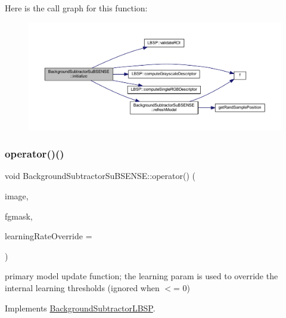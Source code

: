 Here is the call graph for this function\+:\nopagebreak
\begin{figure}[H]
\begin{center}
\leavevmode
\includegraphics[width=350pt]{class_background_subtractor_su_b_s_e_n_s_e_ac84aa66030b04a72435ef473cf0e6a3f_cgraph}
\end{center}
\end{figure}
\mbox{\label{class_background_subtractor_su_b_s_e_n_s_e_aaa60e2883c2b2cf130820b10104a653b}} 
\subsubsection{\texorpdfstring{operator()()}{operator()()}}
{\footnotesize\ttfamily void Background\+Subtractor\+Su\+B\+S\+E\+N\+S\+E\+::operator() (\begin{DoxyParamCaption}\item[{cv\+::\+Input\+Array}]{image,  }\item[{cv\+::\+Output\+Array}]{fgmask,  }\item[{double}]{learning\+Rate\+Override = {} }\end{DoxyParamCaption})\hspace{0.3cm}{\ttfamily [virtual]}}



primary model update function; the learning param is used to override the internal learning thresholds (ignored when $<$= 0) 



Implements \mbox{\hyperlink{class_background_subtractor_l_b_s_p_a4771cac59b7ac865d6ec25cbf049948e}{Background\+Subtractor\+L\+B\+SP}}.



